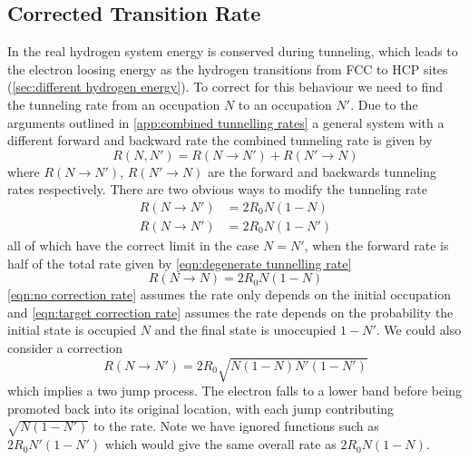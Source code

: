 \subsection{Corrected Transition Rate}\label{sec:corrected transition rate}
In the real hydrogen
system energy is conserved
during tunneling,
which leads
to the electron loosing energy
as the hydrogen transitions from
FCC to HCP sites
(\cref{sec:different hydrogen energy}).
To correct for this behaviour
we need to find the tunneling
rate from an occupation \(N\)
to an occupation \(N'\).
Due to
the arguments outlined in
\cref{app:combined tunnelling rates}
a general system with a different
forward and backward rate the
combined tunneling rate is
given by
\begin{equation}
    R(N,N') = R(N\rightarrow{}N') + R(N'\rightarrow{}N)
\end{equation}
where \(R(N\rightarrow{}N')\), \(R(N'\rightarrow{}N)\)
are the forward and backwards
tunneling rates respectively.
There are
two obvious ways to modify the tunneling
rate
\begin{align}
    R(N\rightarrow{}N') & = 2R_0N(1-N)           \label{eqn:no correction rate}     \\
    R(N\rightarrow{}N') & = 2R_0N(1-N')          \label{eqn:target correction rate}
\end{align}
all of which have the correct
limit in the case \(N=N'\),
when the forward rate is half
of the total rate given
by \cref{eqn:degenerate tunnelling rate}
\begin{equation}
    R(N\rightarrow{}N) = 2R_0N(1-N)
\end{equation}
\cref{eqn:no correction rate}
assumes the rate only depends
on the initial occupation and
\cref{eqn:target correction rate} assumes the rate
depends on the probability the
initial state is occupied
\(N\) and the final state
is unoccupied \(1-N'\). We could
also consider a correction
\begin{equation}
    R(N\rightarrow{}N') = 2R_0 \sqrt{N(1-N)N'(1-N')} \label{eqn:two hop correction}
\end{equation}
which implies a two jump process.
The electron falls to a lower band
before being promoted back into
its original location, with
each jump contributing \(\sqrt{N(1-N')}\)
to the rate. Note we have ignored functions
such as \(2R_0N'(1-N')\) which
would give the same overall rate
as \(2R_0N(1-N)\).

